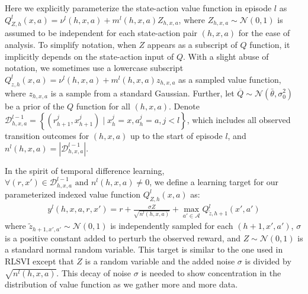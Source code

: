 \documentclass[letterpaper]{article} %
\newcommand{\Sp}[1]{\left(#1\right)}
\newcommand{\Bp}[1]{\left\{#1\right\}}
\newcommand{\abs}[1]{\left|#1\right|}
\theoremstyle{definition}
\begin{document}
Here we explicitly parameterize the state-action value function in episode $l$ as $Q^l_{Z, h}\Sp{x, a}=\nu^l\Sp{h, x, a}+m^l\Sp{h, x, a}Z_{h, x, a}$, where $Z_{h, x, a}\sim\mathcal{N}\Sp{0, 1}$ is assumed to be independent for each state-action pair $\Sp{h, x, a}$ for the ease of analysis. To simplify notation, when $Z$ appears as a subscript of $Q$ function, it implicitly depends on the state-action input of $Q$. With a slight abuse of notation, we sometimes use a lowercase subscript $Q^l_{z,h}\Sp{x, a} = \nu^l(h, x, a) + m^l(h, x, a) z_{h, x, a}$ as a sampled value function, where $z_{h, x, a}$ is a sample from a standard Gaussian. Further, let $\overline{Q}\sim\mathcal{N}\Sp{\bar{\theta}, \sigma_0^2}$ be a prior of the $Q$ function for all $(h, x, a)$. Denote $\mathcal{D}_{h, x, a}^{l-1}=\Bp{(r_{h+1}^j, x_{h+1}^j) \mid x_h^j = x, a_h^j = a, j<l}$, which includes all observed transition outcomes for $(h, x, a)$ up to the start of episode $l$, and $n^l\Sp{h, x, a}=\abs{\mathcal{D}^{l-1}_{h, x, a}}$.

In the spirit of temporal difference learning, $\forall (r, x') \in \mathcal{D}_{h, x, a}^{l-1} \text{ and } n^l\Sp{h, x, a} \neq 0$, we define a learning target for our parameterized indexed value function $Q^l_{Z, h}\Sp{x, a}$ as:
\fontsize{9}{9}
\begin{align*}
y^l(h, x, a, r, x') = r+\frac{\sigma Z}{\sqrt{n^l\Sp{h, x, a}}}+\max_{a'\in\mathcal{A}}Q^l_{\tilde{z}, h+1}\Sp{x', a'}
\end{align*}
\normalsize
where $\tilde{z}_{h+1, x', a'}\sim\mathcal{N}\Sp{0, 1}$ is independently sampled for each $(h+1, x', a')$, $\sigma$ is a positive constant added to perturb the observed reward, and $Z\sim\mathcal{N}\Sp{0, 1}$ is a standard normal random variable. This target is similar to the one used in RLSVI \cite{osband2017deep} except that $Z$ is a random variable and the added noise $\sigma$ is divided by $\sqrt{n^l\Sp{h, x, a}}$. This decay of noise $\sigma$ is needed to show concentration in the distribution of value function as we gather more and more data.
\end{document}
